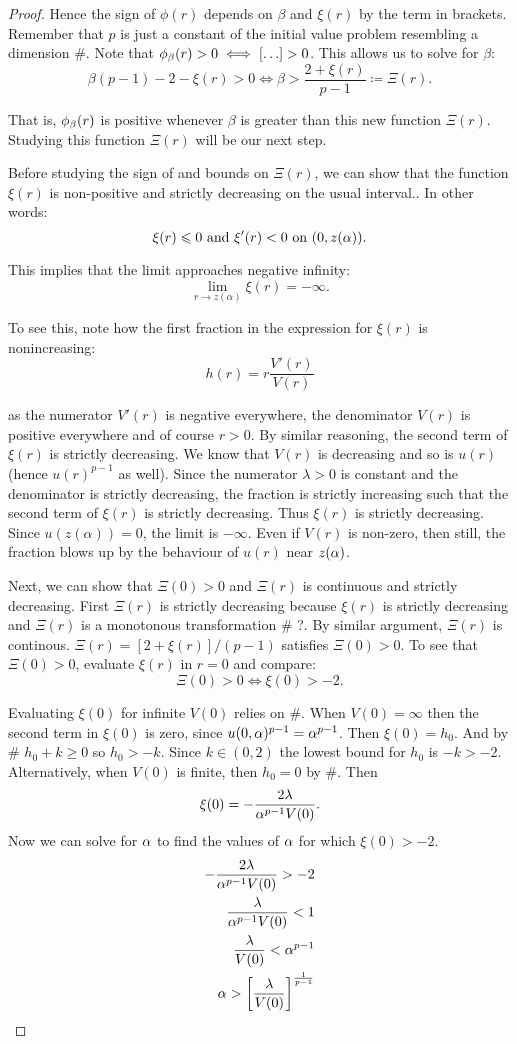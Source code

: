\begin{proof}
Hence the sign of $\phi(r)$ depends on $\beta$ and $\xi(r)$ by the term in
brackets. Remember that $p$ is just a constant of the initial value problem
resembling a dimension \#. Note that $\phi_{\beta}(r)>0 \iff \left[\ldots\right]>0$.
This allows us to solve for $\beta$:
$$\beta(p-1)-2-\xi(r)>0\iff\beta>\frac{2+\xi(r)}{p-1}\coloneqq\Xi(r).$$ 

That is, $\phi_{\beta}(r)$ is positive whenever $\beta$ is greater than this new
function $\Xi(r)$. Studying this function $\Xi(r)$ will be our next step.

Before studying the sign of and bounds on $\Xi(r)$, we can show that the
function $\xi(r)$ is non-positive and strictly decreasing on the usual
interval.. In other words: 
$$\xi(r)\leqslant0\text{ and }\xi'(r)<0\text{ on }(0,z(\alpha)).$$ 

This implies that the limit approaches negative infinity:
$$\lim_{r\to z(\alpha)}\xi(r)=-\infty.$$ 

To see this, note how the first fraction in the expression for $\xi(r)$ is
nonincreasing: 
$$h(r)=r\frac{V'(r)}{V(r)}$$ 

as the numerator $V'(r)$ is negative everywhere, the denominator $V(r)$ is
positive everywhere and of course $r>0$. By similar reasoning, the second term
of $\xi(r)$ is strictly decreasing. We know that $V(r)$ is decreasing and so is
$u(r)$ (hence $u(r)^{p-1}$ as well). Since the numerator $\lambda>0$ is constant
and the denominator is strictly decreasing, the fraction is strictly increasing
such that the second term of $\xi(r)$ is strictly decreasing. Thus $\xi(r)$ is
strictly decreasing. Since $u(z(\alpha))=0$, the limit is $-\infty$. Even if
$V(r)$ is non-zero, then still, the fraction blows up by the behaviour of $u(r)$
near $z(\alpha)$.

Next, we can show that $\Xi(0)>0$ and $\Xi(r)$ is continuous and strictly
decreasing. First $\Xi(r)$ is strictly decreasing because $\xi(r)$ is strictly
decreasing and $\Xi(r)$ is a monotonous transformation \# ?. By similar
argument, $\Xi(r)$ is continous. $\Xi(r)=\left[2+\xi(r)\right]/(p-1)$ satisfies
$\Xi(0)>0$. To see that $\Xi(0)>0$, evaluate $\xi(r)$ in $r=0$ and compare:
$$\Xi(0)>0\iff\xi(0)>-2.$$

Evaluating $\xi(0)$ for infinite $V(0)$ relies on \#. When $V(0)=\infty$ then
the second term in $\xi(0)$ is zero, since $u(0,\alpha)^{p-1}=\alpha^{p-1}$. Then
$\xi(0)=h_0$. And by \# $h_0+k\geq0$ so $h_0>-k$. Since $k\in(0,2)$ the lowest
bound for $h_0$ is $-k>-2$. Alternatively, when $V(0)$ is finite, then $h_0=0$
by \#. Then $$\xi(0)=-\frac{2\lambda}{\alpha^{p-1}V(0)}.$$ Now we can solve for $\alpha$
to find the values of $\alpha$ for which $\xi(0)>-2$.  
\begin{align*}
-\frac{2\lambda}{\alpha^{p-1}V(0)}>-2\\ \frac{\lambda}{\alpha^{p-1}V(0)}<1\\
\frac{\lambda}{V(0)}<\alpha^{p-1}\\ 
\alpha > \left[\frac{\lambda}{V(0)}\right]^{\frac{1}{p-1}} 
\end{align*} 


\end{proof}
